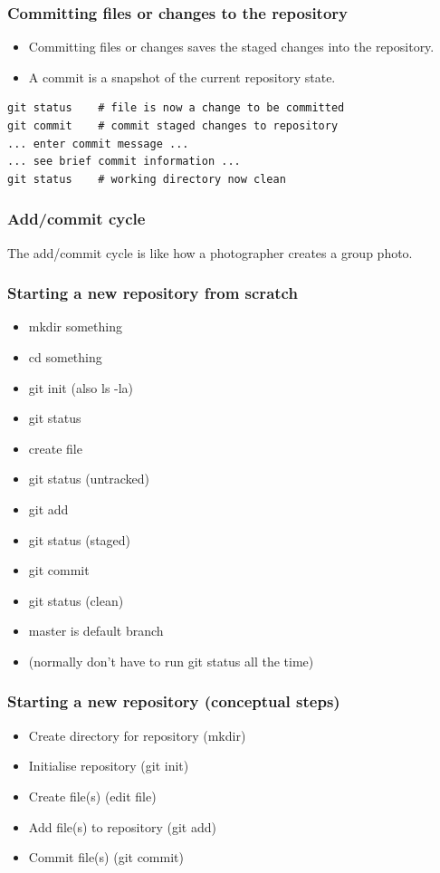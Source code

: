\documentclass{git_course}
\begin{document}
\begin{frame}[fragile]
\frametitle{Committing files or changes to the repository}
\begin{itemize}
    \item Committing files or changes saves the staged changes into the
        repository.
    \item A commit is a snapshot of the current repository state.
\end{itemize}
\begin{lstlisting}
git status    # file is now a change to be committed
git commit    # commit staged changes to repository
... enter commit message ...
... see brief commit information ...
git status    # working directory now clean
\end{lstlisting}
\end{frame}


\begin{frame}
\frametitle{Add/commit cycle}
The add/commit cycle is like how a photographer creates a group photo.
\end{frame}


\begin{frame}
\frametitle{Starting a new repository from scratch}
\begin{itemize}
    \item mkdir something
    \item cd something
    \item git init  (also ls -la)
    \item git status
    \item create file
    \item git status (untracked)
    \item git add
    \item git status (staged)
    \item git commit
    \item git status (clean)
    \item master is default branch
    \item (normally don't have to run git status all the time)
\end{itemize}
\end{frame}

\begin{frame}
    \frametitle{Starting a new repository (conceptual steps)}
    \begin{itemize}
        \item Create directory for repository (mkdir)
        \item Initialise repository (git init)
        \item Create file(s) (edit file)
        \item Add file(s) to repository (git add)
        \item Commit file(s) (git commit)
    \end{itemize}
\end{frame}
\end{document}
